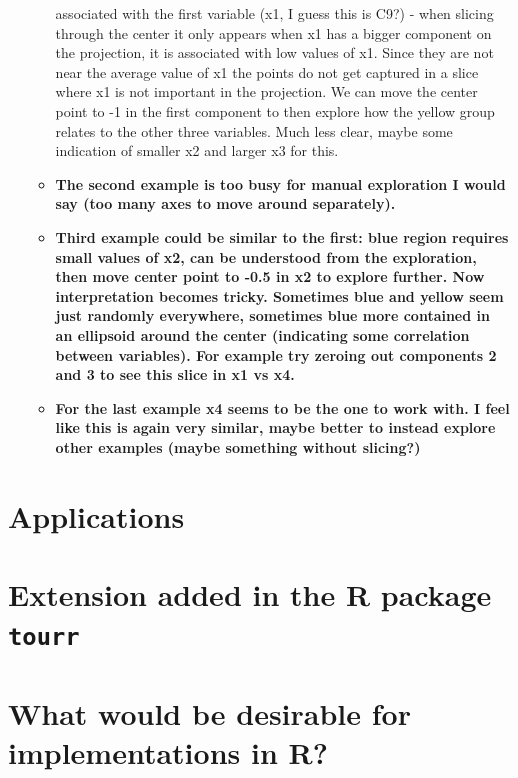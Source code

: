 \documentclass[]{interact}
\theoremstyle{plain}%
\theoremstyle{definition}
\theoremstyle{remark}
\begin{document}
\begin{itemize}
\begin{itemize}
{    associated with the first variable (x1, I guess this is C9?) - when
    slicing through the center it only appears when x1 has a bigger
    component on the projection, it is associated with low values of x1.
    Since they are not near the average value of x1 the points do not
    get captured in a slice where x1 is not important in the projection.
    We can move the center point to -1 in the first component to then
    explore how the yellow group relates to the other three variables.
    Much less clear, maybe some indication of smaller x2 and larger x3
    for this.}
  \item
    \textbf{The second example is too busy for manual exploration I
    would say (too many axes to move around separately).}
  \item
    \textbf{Third example could be similar to the first: blue region
    requires small values of x2, can be understood from the exploration,
    then move center point to -0.5 in x2 to explore further. Now
    interpretation becomes tricky. Sometimes blue and yellow seem just
    randomly everywhere, sometimes blue more contained in an ellipsoid
    around the center (indicating some correlation between variables).
    For example try zeroing out components 2 and 3 to see this slice in
    x1 vs x4.}
  \item
    \textbf{For the last example x4 seems to be the one to work with. I
    feel like this is again very similar, maybe better to instead
    explore other examples (maybe something without slicing?)}
  \end{itemize}
\end{itemize}

\hypertarget{sec:examples}{%
\section{Applications}\label{sec:examples}}

\hypertarget{extension-added-in-the-r-package-tourr}{%
\section{\texorpdfstring{Extension added in the R package
\texttt{tourr}}{Extension added in the R package tourr}}\label{extension-added-in-the-r-package-tourr}}

\hypertarget{what-would-be-desirable-for-implementations-in-r}{%
\section{What would be desirable for implementations in
R?}\label{what-would-be-desirable-for-implementations-in-r}}
\end{document}
